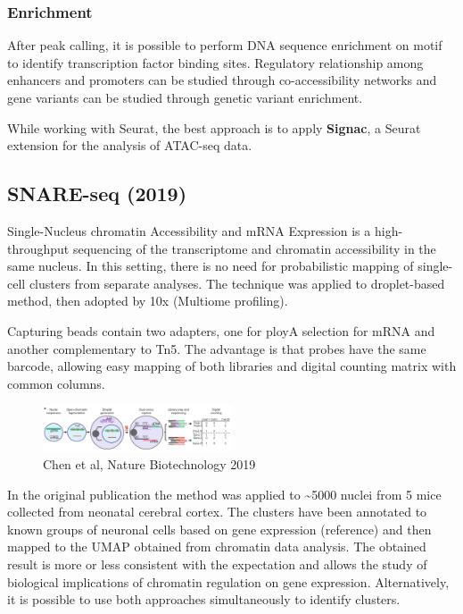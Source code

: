 \hypertarget{enrichment}{%
\subsubsection{Enrichment}\label{enrichment}}

After peak calling, it is possible to perform DNA sequence enrichment on
motif to identify transcription factor binding sites. Regulatory
relationship among enhancers and promoters can be studied through
co-accessibility networks and gene variants can be studied through
genetic variant enrichment.

While working with Seurat, the best approach is to apply
\textbf{Signac}, a Seurat extension for the analysis of ATAC-seq data.

\hypertarget{snare-seq-2019}{%
\subsection{SNARE-seq (2019)}\label{snare-seq-2019}}

Single-Nucleus chromatin Accessibility and mRNA Expression is a
high-throughput sequencing of the transcriptome and chromatin
accessibility in the same nucleus. In this setting, there is no need for
probabilistic mapping of single-cell clusters from separate analyses.
The technique was applied to droplet-based method, then adopted by 10x
(Multiome profiling).

Capturing beads contain two adapters, one for ployA selection for mRNA
and another complementary to Tn5. The advantage is that probes have the
same barcode, allowing easy mapping of both libraries and digital
counting matrix with common columns.

\begin{figure}
\centering
\includegraphics[width=0.5\textwidth]{images/Screenshot_9.png}
\caption{Chen et al, Nature Biotechnology 2019}
\end{figure}


In the original publication the method was applied to
\textasciitilde5000 nuclei from 5 mice collected from neonatal cerebral
cortex. The clusters have been annotated to known groups of neuronal
cells based on gene expression (reference) and then mapped to the UMAP
obtained from chromatin data analysis. The obtained result is more or
less consistent with the expectation and allows the study of biological
implications of chromatin regulation on gene expression. Alternatively,
it is possible to use both approaches simultaneously to identify
clusters.

